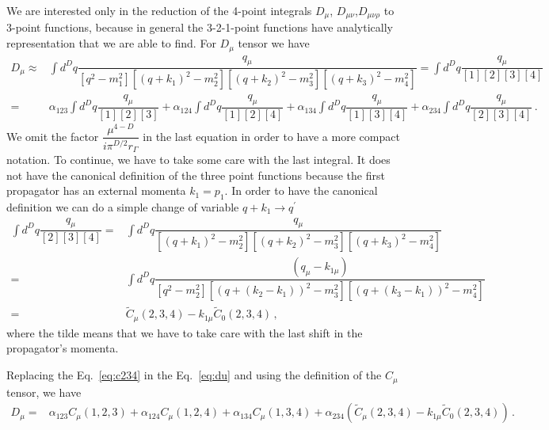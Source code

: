We are interested only in the reduction of the 4-point integrals $D_{\mu}$, $D_{\mu\nu}$,$D_{\mu\nu\rho}$ to 3-point functions, because in general the 3-2-1-point functions have analytically representation that we are able to find. 
For $D_{\mu}$ tensor we have
%
\begin{align}
\label{eq:du}
D_{\mu}\approx &\int d^Dq \dfrac{ q_{\mu} }{[q^2-m_1^2][(q+k_1)^2-m_2^2][(q+k_2)^2-m_3^2][(q+k_3)^2-m_4^2]}
=\int d^Dq \dfrac{ q_{\mu} }{[1][2][3][4]} \nonumber \\
=&\alpha_{123}\int d^Dq \dfrac{ q_{\mu} }{[1][2][3]} 
+\alpha_{124}\int d^Dq \dfrac{ q_{\mu} }{[1][2][4]} 
+\alpha_{134}\int d^Dq \dfrac{ q_{\mu} }{[1][3][4]} 
+\alpha_{234}\int d^Dq \dfrac{ q_{\mu} }{[2][3][4]}\,. 
\end{align} 
%
We omit the factor $\dfrac{\mu^{4-D}}{i\pi^{D/2}r_{\Gamma}}$ in the last equation in order to have a more compact notation. To continue, we have to take some care with the last integral. It does not have the canonical definition of the three point functions because the first propagator has an external momenta $k_1=p_1$. In order to have the canonical definition we can do a simple change of variable $q+k_1\rightarrow q^{'}$ 
\begin{align}
\label{eq:c234}
\int d^Dq \dfrac{ q_{\mu} }{[2][3][4]}=&\int d^Dq \dfrac{ q_{\mu} }{[(q+k_1)^2-m_2^2][(q+k_2)^2-m_3^2][(q+k_3)^2-m_4^2]}\nonumber \\
=& \int d^Dq \dfrac{ (q_{\mu}-k_{1\mu}) }{[q^2-m_2^2][(q+(k_2-k_1))^2-m_3^2][(q+(k_3-k_1))^2-m_4^2]}\nonumber \\
=& \tilde{C}_{\mu}(2,3,4)-k_{1\mu}\tilde{C}_0(2,3,4)\,,
\end{align}
where the tilde means that we have to take care with the last shift in the propagator's momenta.

Replacing the Eq.~\eqref{eq:c234} in the Eq.~\eqref{eq:du} and using the definition of the $C_{\mu}$ tensor, we have
%
\begin{align}
D_{\mu}=& \alpha_{123}C_{\mu}(1,2,3)+\alpha_{124}C_{\mu}(1,2,4)+\alpha_{134}C_{\mu}(1,3,4) +\alpha_{234}\left(\tilde{C}_{\mu}(2,3,4)-k_{1\mu}\tilde{C}_0(2,3,4)\right)\,.
\end{align} 

